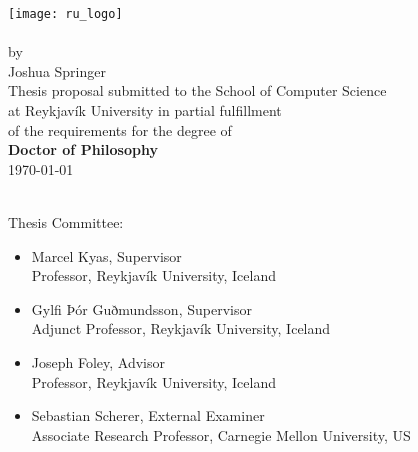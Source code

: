 \begin{titlepage}
    \Large
   \begin{center}

       \vspace*{1cm}

       \texttt{[image: ru\_logo]}~\\[1cm]
       \textbf{\documenttitle}
       ~\\[0.5cm]
       by
       ~\\[0.5cm]
       Joshua Springer
       ~\\[1cm]
       Thesis proposal submitted to the School of Computer Science\\
       at Reykjavík University in partial fulfillment\\
       of the requirements for the degree of\\
       \textbf{Doctor of Philosophy}
       ~\\[0.5cm]
       \specialdate\today
   \end{center}
~\\[0.5cm]
Thesis Committee:
\begin{itemize}[label=\null, leftmargin=1.75cm]
    \item Marcel Kyas, Supervisor\\Professor, Reykjavík University, Iceland
    \item Gylfi Þór Guðmundsson, Supervisor\\Adjunct Professor, Reykjavík University, Iceland
    \item Joseph Foley, Advisor\\Professor, Reykjavík University, Iceland
    \item Sebastian Scherer, External Examiner\\Associate Research Professor, Carnegie Mellon University, US
\end{itemize}

\end{titlepage}